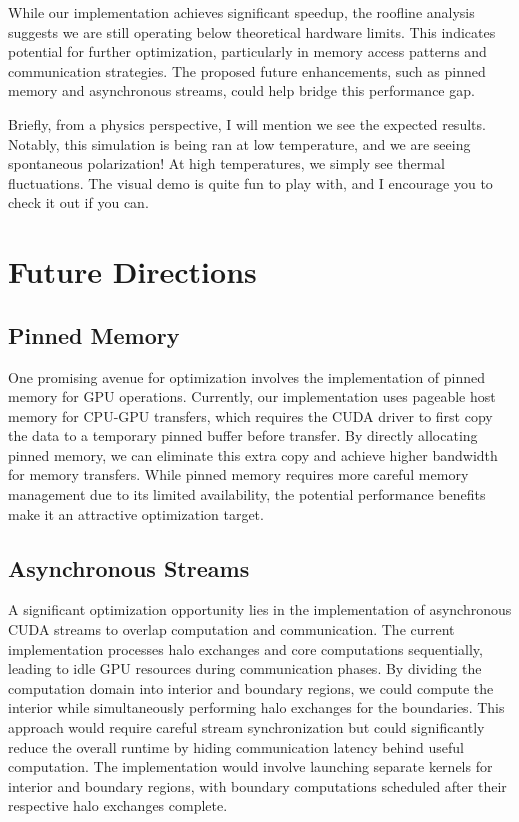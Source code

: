 \documentclass{article}
\begin{document}
While our implementation achieves significant speedup, the roofline analysis suggests we are still operating below theoretical hardware limits. This indicates potential for further optimization, particularly in memory access patterns and communication strategies. The proposed future enhancements, such as pinned memory and asynchronous streams, could help bridge this performance gap.

Briefly, from a physics perspective, I will mention we see the expected results. Notably, this simulation is being ran at low temperature, and we are seeing spontaneous polarization! At high temperatures, we simply see thermal fluctuations. The visual demo is quite fun to play with, and I encourage you to check it out if you can.

\section{Future Directions}
\subsection{Pinned Memory}
One promising avenue for optimization involves the implementation of pinned memory for GPU operations. Currently, our implementation uses pageable host memory for CPU-GPU transfers, which requires the CUDA driver to first copy the data to a temporary pinned buffer before transfer. By directly allocating pinned memory, we can eliminate this extra copy and achieve higher bandwidth for memory transfers. While pinned memory requires more careful memory management due to its limited availability, the potential performance benefits make it an attractive optimization target.


\subsection{Asynchronous Streams}
A significant optimization opportunity lies in the implementation of asynchronous CUDA streams to overlap computation and communication. The current implementation processes halo exchanges and core computations sequentially, leading to idle GPU resources during communication phases. By dividing the computation domain into interior and boundary regions, we could compute the interior while simultaneously performing halo exchanges for the boundaries. This approach would require careful stream synchronization but could significantly reduce the overall runtime by hiding communication latency behind useful computation. The implementation would involve launching separate kernels for interior and boundary regions, with boundary computations scheduled after their respective halo exchanges complete.
\end{document}
